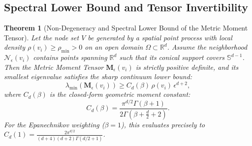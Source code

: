 \documentclass[11pt,a4paper]{article}
\newtheorem{theorem}{Theorem}
\theoremstyle{definition}
\begin{document}
\subsection{Spectral Lower Bound and Tensor Invertibility}

\begin{theorem}[Non-Degeneracy and Spectral Lower Bound of the Metric Moment Tensor]
\label{thm:tensor_nondegeneracy}
Let the node set $V$ be generated by a spatial point process with local density $\rho(v_i) \ge \rho_{\min} > 0$ on an open domain $\Omega \subset \mathbb{R}^d$. 
Assume the neighborhood $\mathcal{N}_\epsilon(v_i)$ contains points spanning $\mathbb{R}^d$ such that its conical support covers $\mathbb{S}^{d-1}$.
Then the Metric Moment Tensor $\mathbf{M}_\epsilon(v_i)$ is strictly positive definite, and its smallest eigenvalue satisfies the sharp continuum lower bound:
\begin{equation}
\lambda_{\min}\left(\mathbf{M}_\epsilon(v_i)\right) \ge C_d(\beta) \, \rho(v_i) \, \epsilon^{d+2},
\end{equation}
where $C_d(\beta)$ is the closed-form geometric moment constant:
\begin{equation}
C_d(\beta) = \frac{\pi^{d/2} \Gamma(\beta + 1)}{2 \Gamma\left(\beta + \frac{d}{2} + 2\right)}.
\end{equation}
For the Epanechnikov weighting ($\beta = 1$), this evaluates precisely to $C_d(1) = \frac{2\pi^{d/2}}{(d+4)(d+2)\Gamma(d/2 + 1)}$.
\end{theorem}
\end{document}
